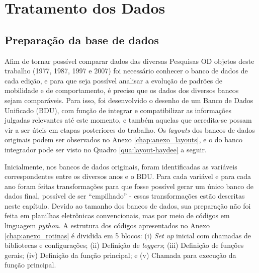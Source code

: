 \chapter{Tratamento dos Dados}\label{chap:trat-dados}

\section{Preparação da base de dados}\label{sec:bd-prep}

Afim de tornar possível comparar dados das diversas Pesquisas OD objetos deste trabalho (1977, 1987, 1997 e 2007) foi necessário conhecer o banco de dados de cada edição, e para que seja possível analisar a evolução de padrões de mobilidade e de comportamento, é preciso que os dados dos diversos bancos sejam comparáveis. Para isso, foi desenvolvido o desenho de um Banco de Dados Unificado (BDU), com função de integrar e compatibilizar as informações julgadas relevantes até este momento, e também aquelas que acredita-se possam vir a ser úteis em etapas posteriores do trabalho. Os \emph{layouts} dos bancos de dados originais podem ser observados no Anexo \ref{chap:anexo_layouts}, e o do banco integrador pode ser visto no Quadro \ref{qua:layout-haydee} a seguir.

Inicialmente, nos bancos de dados originais, foram identificadas as variáveis correspondentes entre os diversos anos e o BDU. Para cada variável e para cada ano foram feitas transformações para que fosse possível gerar um único banco de dados final, possível de ser ``empilhado'' - essas transformações estão descritas neste capítulo. Devido ao tamanho dos bancos de dados, sua preparação não foi feita em planilhas eletrônicas convencionais, mas por meio de códigos em linguagem \textit{python}. A estrutura dos códigos apresentados no Anexo \ref{chap:anexo_rotinas} é dividida em 5 blocos: (i) \textit{Set up} inicial com chamadas de bibliotecas e configurações; (ii) Definição de \textit{loggers}; (iii) Definição de funções gerais; (iv) Definição da função principal; e (v) Chamada para execução da função principal.\\ 

